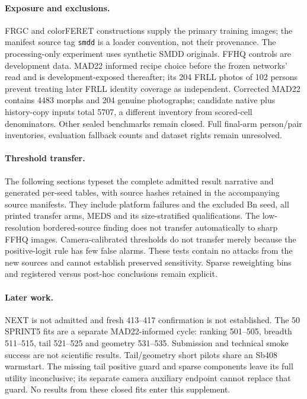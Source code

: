\documentclass[10pt,twocolumn,letterpaper]{article}
\begin{document}
\paragraph{Exposure and exclusions.}
FRGC and colorFERET constructions supply the primary training images; the manifest source tag \texttt{smdd} is a loader convention, not their provenance. The processing-only experiment uses synthetic SMDD originals. FFHQ controls are development data. MAD22 informed recipe choice before the frozen networks' read and is development-exposed thereafter; its 204 FRLL photos of 102 persons prevent treating later FRLL identity coverage as independent. Corrected MAD22 contains 4483 morphs and 204 genuine photographs; candidate native plus history-copy inputs total 5707, a different inventory from scored-cell denominators. Other sealed benchmarks remain closed. Full final-arm person/pair inventories, evaluation fallback counts and dataset rights remain unresolved.

\paragraph{Threshold transfer.}
The following sections typeset the complete admitted result narrative and generated per-seed tables, with source hashes retained in the accompanying source manifests. They include platform failures and the excluded Bn seed, all printed transfer arms, MEDS and its size-stratified qualifications. The low-resolution bordered-source finding does not transfer automatically to sharp FFHQ images. Camera-calibrated thresholds do not transfer merely because the positive-logit rule has few false alarms. These tests contain no attacks from the new sources and cannot establish preserved sensitivity. Sparse reweighting bins and registered versus post-hoc conclusions remain explicit.

\paragraph{Later work.}
NEXT is not admitted and fresh 413--417 confirmation is not established. The 50 SPRINT5 fits are a separate MAD22-informed cycle: ranking 501--505, breadth 511--515, tail 521--525 and geometry 531--535. Submission and technical smoke success are not scientific results. Tail/geometry short pilots share an Sb408 warmstart. The missing tail positive guard and sparse components leave its full utility inconclusive; its separate camera auxiliary endpoint cannot replace that guard. No results from these closed fits enter this supplement.
\end{document}
